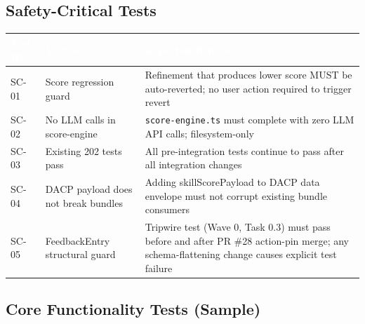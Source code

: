 \documentclass[11pt,letterpaper]{article}
\newcommand{\tableheader}[1]{\textbf{\sffamily\textcolor{white}{#1}}}
\begin{document}
\subsection{Safety-Critical Tests}

\begin{center}
\begin{tabularx}{\textwidth}{C{1.5cm}L{4cm}X}
\toprule
{}
\tableheader{Test ID} & \tableheader{Verifies} & \tableheader{Expected Behavior} \\
\midrule
SC-01 & Score regression guard & Refinement that produces lower score MUST be auto-reverted; no user action required to trigger revert \\
SC-02 & No LLM calls in score-engine & \texttt{score-engine.ts} must complete with zero LLM API calls; filesystem-only \\
SC-03 & Existing 202 tests pass & All pre-integration tests continue to pass after all integration changes \\
SC-04 & DACP payload does not break bundles & Adding skillScorePayload to DACP data envelope must not corrupt existing bundle consumers \\
SC-05 & FeedbackEntry structural guard & Tripwire test (Wave 0, Task 0.3) must pass before and after PR \#28 action-pin merge; any schema-flattening change causes explicit test failure \\
\bottomrule
\end{tabularx}
\end{center}

\subsection{Core Functionality Tests (Sample)}
\end{document}

